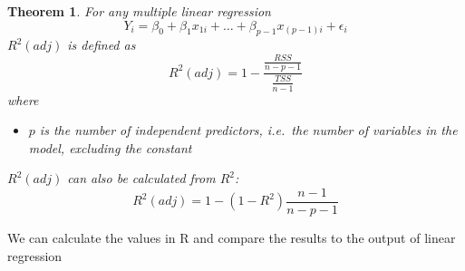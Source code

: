 \documentclass[
]{book}
\providecommand{\tightlist}{%
  \setlength{\itemsep}{0pt}\setlength{\parskip}{0pt}}
\newtheorem{theorem}{Theorem}[chapter]
\theoremstyle{definition}
\theoremstyle{definition}
\theoremstyle{definition}
\theoremstyle{remark}
\begin{document}
\begin{theorem}
\protect\hypertarget{thm:unnamed-chunk-6}{}{\label{thm:unnamed-chunk-6} }For any multiple linear regression
\[Y_i = \beta_0 + \beta_1x_{1i} + \dots + \beta_{p-1}x_{(p-1)i} +  \epsilon_i\] \(R^2(adj)\) is defined as
\[R^2(adj) = 1-\frac{\frac{RSS}{n-p-1}}{\frac{TSS}{n-1}}\] where

\begin{itemize}
\tightlist
\item
  \(p\) is the number of independent predictors, i.e.~the number of variables in the model, excluding the constant
\end{itemize}

\(R^2(adj)\) can also be calculated from \(R^2\):
\[R^2(adj) = 1 - (1-R^2)\frac{n-1}{n-p-1}\]
\end{theorem}

We can calculate the values in R and compare the results to the output of linear regression
\end{document}
